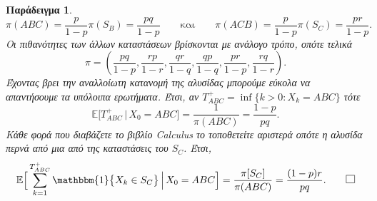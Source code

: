 \documentclass[11pt]{article}
\newcommand{\en}[1]{\textlatin{#1}}
\newtheorem{example}{Παράδειγμα}
\def\E{\mathbb{E}}
\def\CQFD{\hfill\hbox{\vrule\vbox to 8pt{\hrule width 8pt\vfill\hrule}\vrule}}
\begin{document}
\begin{example}
\begin{equation}
\pi(ABC)=\frac{p}{1-p} \pi(S_B)=\frac{pq}{1-p} \qquad\text{και}\qquad \pi(ACB)=\frac{p}{1-p}\pi(S_C)=\frac{pr}{1-p}.
\label{A*}
\end{equation}
Οι πιθανότητες των άλλων καταστάσεων βρίσκονται με ανάλογο τρόπο, οπότε τελικά
\[
\pi=(\frac{pq}{1-p}, \frac{rp}{1-r}, \frac{qr}{1-q}, \frac{qp}{1-q}, \frac{pr}{1-p}, \frac{rq}{1-r}).
\]
Έχοντας βρει την αναλλοίωτη κατανομή της αλυσίδας μπορούμε εύκολα να απαντήσουμε τα υπόλοιπα ερωτήματα. Έτσι, αν $T_{ABC}^+=\inf\{k>0: X_k=ABC\}$ τότε
\[
\E\big[T_{ABC}^+\,|\,X_0=ABC\big]=\frac{1}{\pi(ABC)}=\frac{1-p}{pq}.
\]
Κάθε φορά που διαβάζετε το βιβλίο \en{Calculus} το τοποθετείτε αριστερά οπότε η αλυσίδα περνά από μια από της καταστάσεις του $S_C$. Έτσι,
\[
\E\Big[\sum_{k=1}^{T_{ABC}^+}\mathbbm{1}\big\{X_k\in S_C\big\}\,\Big|\,X_0=ABC\Big]=\frac{\pi[S_C]}{\pi(ABC)}=\frac{(1-p)r}{pq}.\qquad\CQFD
\]
\end{example}
\end{document}

